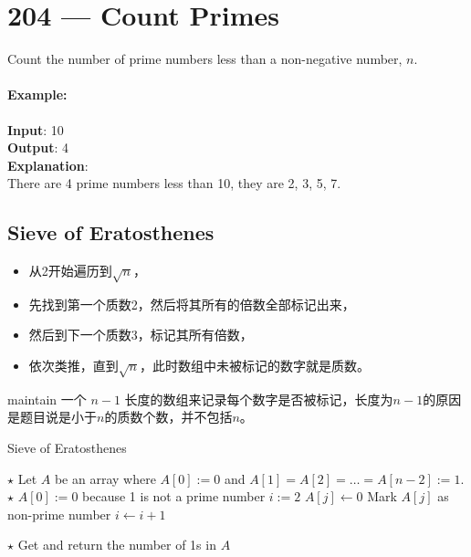 \section{204 --- Count Primes}
Count the number of prime numbers less than a non-negative number, $n$.
\paragraph{Example:}

\begin{flushleft}
\textbf{Input}: 10
\\
\textbf{Output}: 4
\\
\textbf{Explanation}: 
\\
There are 4 prime numbers less than 10, they are 2, 3, 5, 7.
\end{flushleft}
\subsection{Sieve of Eratosthenes}
\begin{CJK*}{UTF8}{gbsn}
\begin{itemize}
\item 从2开始遍历到$\sqrt{n}$，
\item 先找到第一个质数2，然后将其所有的倍数全部标记出来，
\item 然后到下一个质数3，标记其所有倍数，
\item 依次类推，直到$\sqrt{n}$，此时数组中未被标记的数字就是质数。
\end{itemize}
maintain 一个 $n-1$ 长度的数组来记录每个数字是否被标记，长度为$n-1$的原因是题目说是小于$n$的质数个数，并不包括$n$。
\end{CJK*}
\setcounter{algorithm}{0}
\begin{algorithm}[H]
\caption{Sieve of Eratosthenes}
\begin{algorithmic}[1]
\State $\star$ Let $A$ be an array where $A[0]:=0$ and $A[1]=A[2]=\ldots=A[n-2]:=1$.
\State $\star$ $A[0]:=0$ because 1 is not a prime number
\State $i:=2$
\State $A[j]\gets 0$ \Comment Mark $A[j]$ as non-prime number
\EndFor
\EndIf
\State $i\gets i+1$
\EndWhile
{}
\end{algorithmic}
\end{algorithm}
\begin{algorithm}[H]
\begin{algorithmic}[1]
\State $\star$ Get and return the number of 1s in $A$
\EndProcedure
\end{algorithmic}
\end{algorithm}
